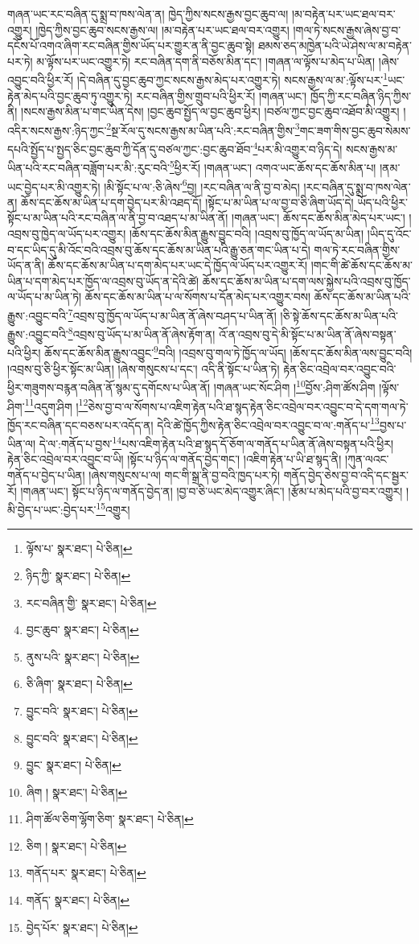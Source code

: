 གཞན་ཡང་རང་བཞིན་དུ་སྨྲ་བ་ཁས་ལེན་ན། ཁྱེད་ཀྱིས་སངས་རྒྱས་བྱང་ཆུབ་ལ། །མ་བརྟེན་པར་ཡང་ཐལ་བར་འགྱུར། །ཁྱེད་ཀྱིས་བྱང་ཆུབ་སངས་རྒྱས་ལ། །མ་བརྟེན་པར་ཡང་ཐལ་བར་འགྱུར། །གལ་ཏེ་སངས་རྒྱས་ཞེས་བྱ་བ་དངོས་པོ་འགའ་ཞིག་རང་བཞིན་གྱིས་ཡོད་པར་གྱུར་ན་ནི་བྱང་ཆུབ་སྟེ། ཐམས་ཅད་མཁྱེན་པའི་ཡེ་ཤེས་ལ་མ་བརྟེན་པར་ཏེ། མ་ལྟོས་པར་ཡང་འགྱུར་ཏེ། རང་བཞིན་དག་ནི་བཅོས་མིན་དང་། །གཞན་ལ་ལྟོས་པ་མེད་པ་ཡིན། །ཞེས་འབྱུང་བའི་ཕྱིར་རོ། །དེ་བཞིན་དུ་བྱང་ཆུབ་ཀྱང་སངས་རྒྱས་མེད་པར་འགྱུར་ཏེ། སངས་རྒྱས་ལ་མ་:ལྟོས་པར་\footnote{ལྟོས་པ་  སྣར་ཐང་།  པེ་ཅིན། }ཡང་རྟེན་མེད་པའི་བྱང་ཆུབ་ཏུ་འགྱུར་ཏེ། རང་བཞིན་གྱིས་གྲུབ་པའི་ཕྱིར་རོ། །གཞན་ཡང་། ཁྱོད་ཀྱི་རང་བཞིན་ཉིད་ཀྱིས་ནི། །སངས་རྒྱས་མིན་པ་གང་ཡིན་དེས། །བྱང་ཆུབ་སྤྱོད་ལ་བྱང་ཆུབ་ཕྱིར། །བཙལ་ཀྱང་བྱང་ཆུབ་འཐོབ་མི་འགྱུར། །འདིར་སངས་རྒྱས་:ཉིད་ཀྱང་\footnote{ཉིད་ཀྱི་  སྣར་ཐང་།  པེ་ཅིན། }སྔ་རོལ་དུ་སངས་རྒྱས་མ་ཡིན་པའི་:རང་བཞིན་གྱིས་\footnote{རང་བཞིན་གྱི་  སྣར་ཐང་།  པེ་ཅིན། }གང་ཟག་གིས་བྱང་ཆུབ་སེམས་དཔའི་སྤྱོད་པ་སྤྱད་ཅིང་བྱང་ཆུབ་ཀྱི་དོན་དུ་བཙལ་ཀྱང་:བྱང་ཆུབ་ཐོབ་\footnote{བྱང་ཆུབ་  སྣར་ཐང་།  པེ་ཅིན། }པར་མི་འགྱུར་བ་ཉིད་དེ། སངས་རྒྱས་མ་ཡིན་པའི་རང་བཞིན་བཟློག་པར་མི་:རུང་བའི་\footnote{ནུས་པའི་  སྣར་ཐང་།  པེ་ཅིན། }ཕྱིར་རོ། །གཞན་ཡང་། འགའ་ཡང་ཆོས་དང་ཆོས་མིན་པ། །ནམ་ཡང་བྱེད་པར་མི་འགྱུར་ཏེ། །མི་སྟོང་པ་ལ་:ཅི་ཞེས་\footnote{ཅི་ཞིག་  སྣར་ཐང་།  པེ་ཅིན། }བྱ། །རང་བཞིན་ལ་ནི་བྱ་བ་མེད། །རང་བཞིན་དུ་སྨྲ་བ་ཁས་ལེན་ན། ཆོས་དང་ཆོས་མ་ཡིན་པ་དག་བྱེད་པར་མི་འཐད་དོ། །སྟོང་པ་མ་ཡིན་པ་ལ་བྱ་བ་ཅི་ཞིག་ཡོད་དེ། ཡོད་པའི་ཕྱིར་སྟོང་པ་མ་ཡིན་པའི་རང་བཞིན་ལ་ནི་བྱ་བ་འཐད་པ་མ་ཡིན་ནོ། །གཞན་ཡང་། ཆོས་དང་ཆོས་མིན་མེད་པར་ཡང་། །འབྲས་བུ་ཁྱེད་ལ་ཡོད་པར་འགྱུར། །ཆོས་དང་ཆོས་མིན་རྒྱུས་བྱུང་བའི། །འབྲས་བུ་ཁྱོད་ལ་ཡོད་མ་ཡིན། །ཡིད་དུ་འོང་བ་དང་ཡིད་དུ་མི་འོང་བའི་འབྲས་བུ་ཆོས་དང་ཆོས་མ་ཡིན་པའི་རྒྱུ་ཅན་གང་ཡིན་པ་དེ། གལ་ཏེ་རང་བཞིན་གྱིས་ཡོད་ན་ནི། ཆོས་དང་ཆོས་མ་ཡིན་པ་དག་མེད་པར་ཡང་དེ་ཁྱོད་ལ་ཡོད་པར་འགྱུར་རོ། །གང་གི་ཚེ་ཆོས་དང་ཆོས་མ་ཡིན་པ་དག་མེད་པར་ཁྱོད་ལ་འབྲས་བུ་ཡོད་ན་དེའི་ཚེ། ཆོས་དང་ཆོས་མ་ཡིན་པ་དག་ལས་སྐྱེས་པའི་འབྲས་བུ་ཁྱོད་ལ་ཡོད་པ་མ་ཡིན་ཏེ། ཆོས་དང་ཆོས་མ་ཡིན་པ་ལ་སོགས་པ་དོན་མེད་པར་འགྱུར་བས། ཆོས་དང་ཆོས་མ་ཡིན་པའི་རྒྱུས་:འབྱུང་བའི་\footnote{བྱུང་བའི་  སྣར་ཐང་།  པེ་ཅིན། }འབྲས་བུ་ཁྱོད་ལ་ཡོད་པ་མ་ཡིན་ནོ་ཞེས་བཤད་པ་ཡིན་ནོ། །ཅི་སྟེ་ཆོས་དང་ཆོས་མ་ཡིན་པའི་རྒྱུས་:འབྱུང་བའི་\footnote{བྱུང་བའི་  སྣར་ཐང་།  པེ་ཅིན། }འབྲས་བུ་ཡོད་པ་མ་ཡིན་ནོ་ཞེས་རྟོག་ན། འོ་ན་འབྲས་བུ་དེ་མི་སྟོང་པ་མ་ཡིན་ནོ་ཞེས་བསྟན་པའི་ཕྱིར། ཆོས་དང་ཆོས་མིན་རྒྱུས་འབྱུང་\footnote{བྱུང་  སྣར་ཐང་།  པེ་ཅིན། }བའི། །འབྲས་བུ་གལ་ཏེ་ཁྱོད་ལ་ཡོད། །ཆོས་དང་ཆོས་མིན་ལས་བྱུང་བའི། །འབྲས་བུ་ཅི་ཕྱིར་སྟོང་མ་ཡིན། །ཞེས་གསུངས་པ་དང་། འདི་ནི་སྟོང་པ་ཡིན་ཏེ། རྟེན་ཅིང་འབྲེལ་བར་འབྱུང་བའི་ཕྱིར་གཟུགས་བརྙན་བཞིན་ནོ་སྙམ་དུ་དགོངས་པ་ཡིན་ནོ། །གཞན་ཡང་སོང་ཤིག །\footnote{ཞིག །  སྣར་ཐང་།  པེ་ཅིན། }བྱོས་:ཤིག་ཚོས་ཤིག །ལྟོས་ཤིག་\footnote{ཤིག་ཚོལ་ཅིག་ལྷོག་ཅིག་  སྣར་ཐང་།  པེ་ཅིན། }འདུག་ཤིག །\footnote{ཅིག །  སྣར་ཐང་།  པེ་ཅིན། }ཅེས་བྱ་བ་ལ་སོགས་པ་འཇིག་རྟེན་པའི་ཐ་སྙད་རྟེན་ཅིང་འབྲེལ་བར་འབྱུང་བ་དེ་དག་གལ་ཏེ་ཁྱོད་རང་བཞིན་དང་བཅས་པར་འདོད་ན། དེའི་ཚེ་ཁྱོད་ཀྱིས་རྟེན་ཅིང་འབྲེལ་བར་འབྱུང་བ་ལ་:གནོད་པ་\footnote{གནོད་པར་  སྣར་ཐང་།  པེ་ཅིན། }བྱས་པ་ཡིན་ལ། དེ་ལ་:གནོད་པ་བྱས་\footnote{གནོད་  སྣར་ཐང་།  པེ་ཅིན། }པས་འཇིག་རྟེན་པའི་ཐ་སྙད་དོ་ཅོག་ལ་གནོད་པ་ཡིན་ནོ་ཞེས་བསྟན་པའི་ཕྱིར། རྟེན་ཅིང་འབྲེལ་བར་འབྱུང་བ་ཡི། །སྟོང་པ་ཉིད་ལ་གནོད་བྱེད་གང་། །འཇིག་རྟེན་པ་ཡི་ཐ་སྙད་ནི། །ཀུན་ལའང་གནོད་པ་བྱེད་པ་ཡིན། །ཞེས་གསུངས་པ་ལ། གང་གི་སྒྲ་ནི་བྱ་བའི་ཁྱད་པར་ཏེ། གནོད་བྱེད་ཅེས་བྱ་བ་འདི་དང་སྦྱར་རོ། །གཞན་ཡང་། སྟོང་པ་ཉིད་ལ་གནོད་བྱེད་ན། །བྱ་བ་ཅི་ཡང་མེད་འགྱུར་ཞིང་། །རྩོམ་པ་མེད་པའི་བྱ་བར་འགྱུར། །མི་བྱེད་པ་ཡང་:བྱེད་པར་\footnote{བྱེད་པོར་  སྣར་ཐང་།  པེ་ཅིན། }འགྱུར། 